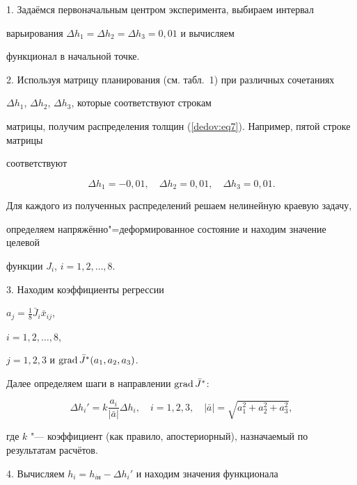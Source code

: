 1. Задаёмся первоначальным центром эксперимента, выбираем интервал

варьирования $\Delta h_1 =\Delta h_2 =\Delta h_3 =0,01$ и вычисляем

функционал в начальной точке.









2. Используя матрицу планирования (см. табл.~1) при различных сочетаниях

$\Delta h_1$, $\Delta h_2$, $\Delta h_3 $, которые соответствуют строкам

матрицы, получим распределения толщин (\ref{dedov:eq7}). Например, пятой строке матрицы

соответствуют

\[

\Delta h_1 =-0,01,\quad \Delta h_2 =0,01,\quad \Delta h_3 =0,01.

\]

Для каждого из полученных распределений решаем нелинейную краевую задачу,

определяем напряжённо"=деформированное состояние и находим значение целевой

функции $J_i $, $i=1, 2, \dots, 8$.







3. Находим коэффициенты регрессии

$a_j =\frac18{\bar {J}_i \bar {x}_{ij}}$,

$i=1, 2, \dots, 8$,

$j=1, 2, 3 $ и ${\rm grad}\, \bar {J}^\ast (a_1, a_2, a_3 )$.

Далее определяем шаги в направлении ${\rm grad }\,\bar {J}^\ast $:

\[

\Delta h_i' =k\frac{a_i }{\left| {\bar {a}} \right|}\Delta h_i,

\quad

i=1, 2, 3,

\quad

\left| \bar {a} \right|=\sqrt {a_1 ^2+a_2 ^2+a_3 ^2} ,

\]

где $k$ "--- коэффициент (как правило, апостериорный), назначаемый по результатам расчётов.



4. Вычисляем $h_i =h_{i\text{н}} -\Delta h_i'$ и находим значения функционала


